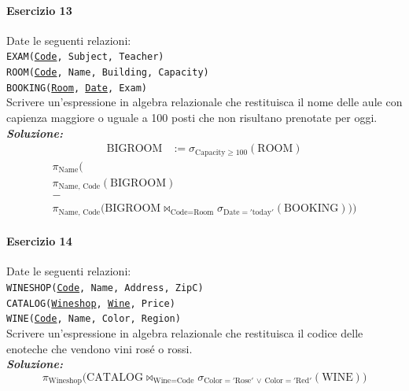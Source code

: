 \documentclass[12pt]{extarticle}
\begin{document}
\vspace{1em}

\paragraph{Esercizio 13} Date le seguenti relazioni:\\

\noindent \texttt{EXAM(\underline{Code}, Subject, Teacher)}\\
\texttt{ROOM(\underline{Code}, Name, Building, Capacity)}\\
\texttt{BOOKING(\underline{Room}, \underline{Date}, Exam)}\\[0.5em]

\noindent Scrivere un'espressione in algebra relazionale che restituisca il nome delle aule con capienza maggiore o uguale a 100 posti che non risultano prenotate per oggi.\\

\noindent \textbf{\textit{Soluzione:}}
\[
\begin{aligned}
\text{BIGROOM} &:= \sigma_{\text{Capacity} \ge 100}(\text{ROOM})
\end{aligned}
\]
\[
\begin{gathered}
\pi_{\text{Name}} \Big( \\
\pi_{\text{Name, Code}}(\text{BIGROOM}) \\
- \\
\pi_{\text{Name, Code}} \big( \text{BIGROOM} \bowtie_{\text{Code} = \text{Room}} \sigma_{\text{Date} = '\text{today}'}(\text{BOOKING}) \big) \Big)
\end{gathered}
\]

\paragraph{Esercizio 14} Date le seguenti relazioni:\\

\noindent \texttt{WINESHOP(\underline{Code}, Name, Address, ZipC)}\\
\texttt{CATALOG(\underline{Wineshop}, \underline{Wine}, Price)}\\
\texttt{WINE(\underline{Code}, Name, Color, Region)}\\[0.5em]

\noindent Scrivere un'espressione in algebra relazionale che restituisca il codice delle enoteche che vendono vini rosé o rossi.\\

\noindent \textbf{\textit{Soluzione:}}
\[
\pi_{\text{Wineshop}} \Big( \text{CATALOG} \bowtie_{\text{Wine} = \text{Code}} \sigma_{\text{Color} = '\text{Rose}' \,\lor\, \text{Color} = '\text{Red}'}(\text{WINE}) \Big)
\]
\end{document}
